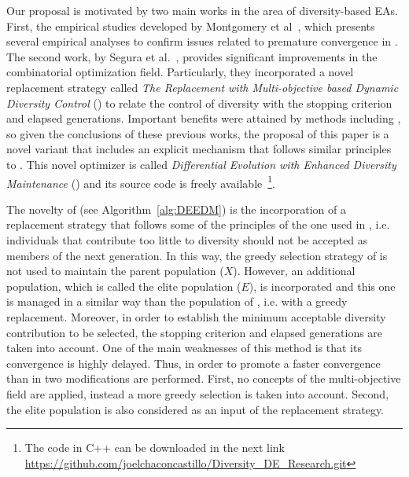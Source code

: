 Our proposal is motivated by two main works in the area of diversity-based EAs.
%
First, the empirical studies developed by Montgomery et al~\cite{montgomery2012simple},
which presents several empirical analyses to confirm issues related to premature convergence in \DE{}.
%
The second work, by Segura et al.~\cite{segura2016novel}, provides significant improvements in the combinatorial optimization field.
%
Particularly, they incorporated a novel replacement strategy called \textit{The Replacement with Multi-objective based Dynamic Diversity Control} (\RMDDC{}) 
to relate the control of diversity with the stopping criterion and elapsed generations.
%
Important benefits were attained by methods including \RMDDC{}, so given the conclusions of these previous works, the proposal of this paper is a 
novel \DE{} variant that includes an explicit mechanism that follows similar principles to \RMDDC{}.
%
This novel optimizer is called \textit{Differential Evolution with Enhanced Diversity Maintenance} (\DEEDM{}) and its source
code is freely available~\footnote{The code in C++ can be downloaded in the next link \url{https://github.com/joelchaconcastillo/Diversity\_DE\_Research.git}}.

The novelty of \DEEDM{} (see Algorithm~\ref{alg:DEEDM}) is the incorporation of a replacement strategy that follows some of the principles of the one used in \RMDDC{}, i.e.
individuals that contribute too little to diversity should not be accepted as members of the next generation.
%
In this way, the greedy selection strategy of \DE{} is not used to maintain the parent population ($X$).
%
However, an additional population, which is called the elite population ($E$), is incorporated and this one is managed in a similar way than 
the population of \DE{}, i.e. with a greedy replacement.
%
Moreover, in order to establish the minimum acceptable diversity contribution to be selected, the stopping criterion and elapsed
generations are taken into account.
%
One of the main weaknesses of this method is that its convergence is highly delayed.
%
Thus, in order to promote a faster convergence than in \RMDDC{} two modifications are performed.
%
First, no concepts of the multi-objective field are applied, instead a more greedy selection is taken into account.
%
Second, the elite population is also considered as an input of the replacement strategy.

